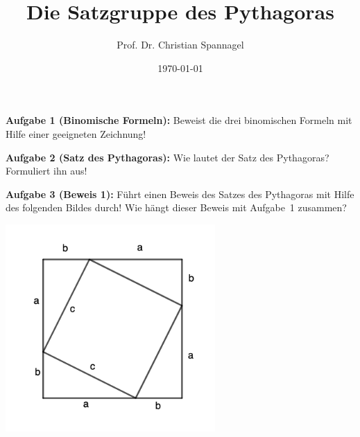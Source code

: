 \documentclass{../cssheet}
\title{Die Satzgruppe des Pythagoras}
\author{Prof. Dr. Christian Spannagel}
\date{\today}
\begin{document}
\printtitle

\textbf{Aufgabe 1 (Binomische Formeln):}  Beweist die drei binomischen Formeln mit Hilfe einer geeigneten Zeichnung!

\textbf{Aufgabe 2 (Satz des Pythagoras):}  Wie lautet der Satz des Pythagoras? Formuliert ihn aus!

\textbf{Aufgabe 3 (Beweis 1):}  Führt einen Beweis des Satzes des Pythagoras mit Hilfe des folgenden Bildes durch! Wie hängt dieser Beweis mit Aufgabe~1 zusammen?
\begin{center}
\includegraphics[width=8cm]{satz-des-py-01.png}
\end{center}
\end{document}
